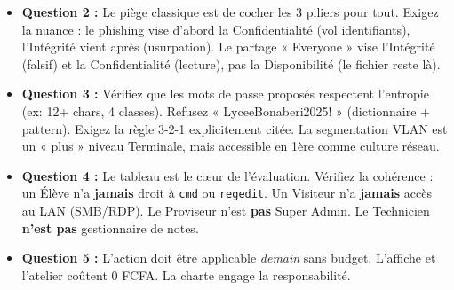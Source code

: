 \documentclass[11pt]{article}
\newcommand{\cle}[1]{{\popxbold\color{popdark}#1}}
\begin{document}
\begin{exoresolu}
\begin{itemize}
    \item \textbf{Question 2 :} Le piège classique est de cocher les 3 piliers pour tout. Exigez la nuance : le phishing vise d'abord la \cle{Confidentialité} (vol identifiants), l'\cle{Intégrité} vient après (usurpation). Le partage « Everyone » vise l'\cle{Intégrité} (falsif) et la \cle{Confidentialité} (lecture), pas la \cle{Disponibilité} (le fichier reste là).
    \item \textbf{Question 3 :} Vérifiez que les mots de passe proposés respectent l'entropie (ex: 12+ chars, 4 classes). Refusez « LyceeBonaberi2025! » (dictionnaire + pattern). Exigez la règle 3-2-1 explicitement citée. La segmentation VLAN est un « plus » niveau Terminale, mais accessible en 1ère comme culture réseau.
    \item \textbf{Question 4 :} Le tableau est le cœur de l'évaluation. Vérifiez la cohérence : un Élève n'a \textbf{jamais} droit à \texttt{cmd} ou \texttt{regedit}. Un Visiteur n'a \textbf{jamais} accès au LAN (SMB/RDP). Le Proviseur n'est \textbf{pas} Super Admin. Le Technicien \textbf{n'est pas} gestionnaire de notes.
    \item \textbf{Question 5 :} L'action doit être applicable \emph{demain} sans budget. L'affiche et l'atelier coûtent 0 FCFA. La charte engage la responsabilité.
\end{itemize}
\end{exoresolu}
\end{document}
